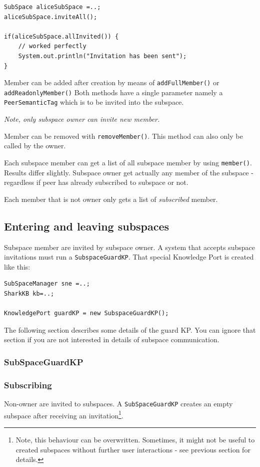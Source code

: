 \begin{verbatim}
SubSpace aliceSubSpace =..;
aliceSubSpace.inviteAll();

if(aliceSubSpace.allInvited()) {
    // worked perfectly
    System.out.println("Invitation has been sent");
}
\end{verbatim}

Member can be added after creation by means of {\verb|addFullMember()|} or
{\verb|addReadonlyMember()|} Both methods have a single parameter namely a \newline
{\verb|PeerSemanticTag|} which is to be invited into the subspace.

{\it Note, only subspace owner can invite new member.}

Member can be removed with {\verb|removeMember()|}. This method can also only be called by the owner.

Each subspace member can get a list of all subspace member by using 
{\verb|member()|}. Results differ slightly. Subspace owner get actually any member
of the subspace - regardless if peer has already subscribed to subspace or not.

Each member that is not owner only gets a list of {\it subscribed} member.

\subsection{Entering and leaving subspaces}
Subspace member are invited by subspace owner. A system that accepts subspace invitations must run a {\verb|SubspaceGuardKP|}. That special Knowledge Port is 
created like this:

\begin{verbatim}
SubSpaceManager sne =..;
SharkKB kb=..;

KnowledgePort guardKP = new SubspaceGuardKP();
\end{verbatim}

The following section describes some details of the guard KP. You can ignore that section if you are not interested in details of subspace communication.

\subsubsection{SubSpaceGuardKP}


\subsubsection{Subscribing}
Non-owner are invited to subspaces. A {\verb|SubSpaceGuardKP|} creates an empty subspace after receiving an invitation\footnote{Note, this behaviour can be overwritten. Sometimes, it might not be useful to created subspaces without
further user interactions - see previous section for details.}.

